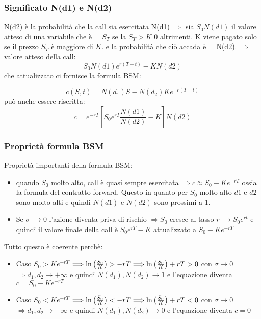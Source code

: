 \documentclass[12pt,a4paper]{report}
\begin{document}
\subsubsection{Significato N(d1) e N(d2)}
N(d2) è la probabilità che la call sia esercitata
\newline
N(d1) \(\Longrightarrow\) sia \(S_0N(d1)\) il valore atteso di una variabile che è = \(S_T\) se la \(S_T > K\) 0 altrimenti.
\newline
K viene pagato solo se il prezzo \(S_T\) è maggiore di \(K\). e la probabilità che ciò accada è = N(d2).
\(\Longrightarrow\) valore atteso della call:
\[
S_0 N(d1)e^{r(T-t)} - K N(d2)
\]
che attualizzato ci fornisce la formula BSM:

\[
c(S,t) = N(d_1) S - N(d_2) K e^{-r(T-t)}
\]
può anche essere riscritta:
\[
c = e^{-rT}[S_0 e^{rT} \frac{N(d1)}{N(d2)}-K]N(d2)
\]
\newpage
\subsubsection{Proprietà formula BSM}
Proprietà importanti della formula BSM:
\begin{itemize}
    \item  quando \(S_0\) molto alto, call è quasi sempre esercitata \(\Longrightarrow c \approx S_0 - Ke^{-rT}\) ossia la formula del contratto forward. Questo in quanto per \(S_0\) molto alto \(d1\) e \(d2\) sono molto alti e quindi \(N(d1)\) e \(N(d2)\) sono prossimi a 1.
    \item Se \(\sigma\) \(\rightarrow 0\) l'azione diventa priva di rischio \(\Longrightarrow S_0\) cresce al tasso \(r\) \(\rightarrow S_0e^{rt}\) e quindi il valore finale della call è \(S_0e^{rT} - K\) attualizzato a \(S_0 - Ke^{-rT}\)
\end{itemize}
Tutto questo è coerente perchè:
\begin{itemize}
\item Caso \textbf{\(S_0 > Ke^{-rT}\)} 
\(\Longrightarrow \ln\left(\frac{S_0}{K}\right) > -rT \newline
\Longrightarrow \ln\left(\frac{S_0}{K}\right) + rT > 0\) \newline
con \(\sigma \rightarrow 0\) 
\(\Longrightarrow d_1, d_2 \rightarrow +\infty\) 
e quindi \(N(d_1), N(d_2) \rightarrow 1\) \newline
e l'equazione diventa \(c = S_0 - K e^{-rT}\)
\item Caso \textbf{\(S_0 < Ke^{-rT}\)}
\(\Longrightarrow \ln\left(\frac{S_0}{K}\right) < -rT \newline
\Longrightarrow \ln\left(\frac{S_0}{K}\right) + rT < 0\) \newline
con \(\sigma \rightarrow 0\) 
\(\Longrightarrow d_1, d_2 \rightarrow -\infty\) 
e quindi \(N(d_1), N(d_2) \rightarrow 0\) \newline
e l'equazione diventa \(c = 0\)
\end{itemize}
\newpage
\end{document}
